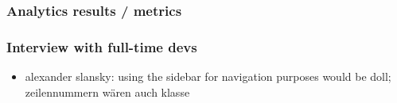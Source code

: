 \subsubsection{Analytics results /
metrics}\label{analytics-results-metrics}

\subsubsection{Interview with full-time
devs}\label{interview-with-full-time-devs}

\begin{itemize}
\itemsep1pt\parskip0pt
\item
  alexander slansky: using the sidebar for navigation purposes would be
  doll; zeilennummern wären auch klasse
\end{itemize}
